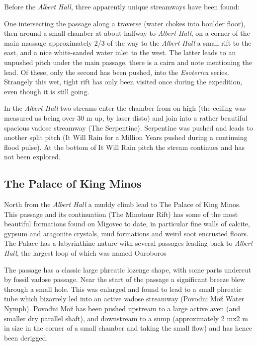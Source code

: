 Before the \emph{Albert Hall}, three apparently unique streamways have
been found:

One intersecting the passage along a traverse (water chokes into boulder
floor), then around a small chamber at about halfway to \emph{Albert
Hall}, on a corner of the main massage approximately 2/3 of the way to
the \emph{Albert Hall} a small rift to the east, and a nice white-sanded
water inlet to the west. The latter leads to an unpushed pitch under the
main passage, there is a cairn and note mentioning the lead. Of these,
only the second has been pushed, into the \emph{Esoterica} series.
Strangely this wet, tight rift has only been visited once during the
expedition, even though it is still going.

In the \emph{Albert Hall} two streams enter the chamber from on high
(the ceiling was measured as being over 30 m up, by laser disto) and
join into a rather beautiful spacious vadose streamway (The Serpentine).
Serpentine was pushed and leads to another split pitch (It Will Rain for
a Million Years \textemdash{} pushed during a continuing flood pulse).
At the bottom of It Will Rain pitch the stream continues and has not
been explored.

\hypertarget{the-palace-of-king-minos}{%
\subsection{The Palace of King Minos}\label{the-palace-of-king-minos}}

North from the \emph{Albert Hall} a muddy climb lead to The Palace of
King Minos. This passage and its continuation (The Minotaur Rift) has
some of the most beautiful formations found on Migovec to date, in
particular fine walls of calcite, gypsum and aragonite crystals, mud
formations and weird soot encrusted floors. The Palace has a
labyrinthine nature with several passages leading back to \emph{Albert
Hall}, the largest loop of which was named Ouroboros

The passage has a classic large phreatic lozenge shape, with some parts
undercut by fossil vadose passage. Near the start of the passage a
significant breeze blew through a small hole. This was enlarged and
found to lead to a small phreatic tube which bizarrely led into an
active vadose streamway (Povodni Mo\v{z} \textemdash{} Water Nymph).
Povodni Mo\v{z} has been pushed upstream to a large active aven (and
smaller dry parallel shaft), and downstream to a sump (approximately 2
mx2 m in size in the corner of a small chamber and taking the small
flow) and has hence been derigged.

